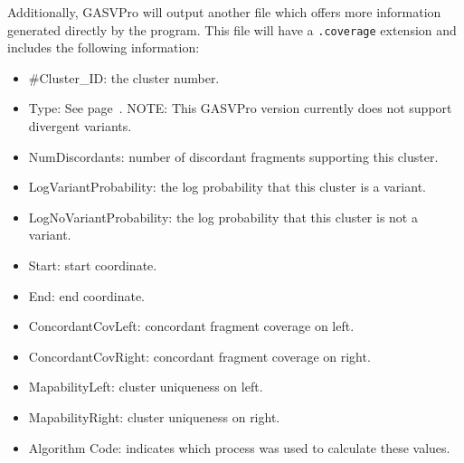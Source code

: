 \documentclass[11pt]{article}
\begin{document}
Additionally, GASVPro will output another file which offers more information generated directly by the program. This file will have a \verb+.coverage+ extension and includes the following information:
\begin{framed}
\begin{itemize}
	\item[] \#Cluster\_ID: {\small the cluster number.}
	\item[] Type: {\small See page~\pageref{structvartypes}}. {\scriptsize NOTE: This GASVPro version currently does not support divergent variants.}
	\item[] NumDiscordants: {\small number of discordant fragments supporting this cluster.}
	\item[] LogVariantProbability: {\small the log probability that this cluster is a variant.}
	\item[] LogNoVariantProbability: {\small the log probability that this cluster is not a variant.}
	\item[] Start: {\small start coordinate.}
	\item[] End: {\small end coordinate.}
	\item[] ConcordantCovLeft: {\small concordant fragment coverage on left.}
	\item[] ConcordantCovRight: {\small concordant fragment coverage on right.}
	\item[] MapabilityLeft: {\small cluster uniqueness on left.}
	\item[] MapabilityRight: {\small cluster uniqueness on right.}
	\item[] Algorithm Code: {\small indicates which process was used to calculate these values.}
	\end{itemize}
\end{framed}
\end{document}
